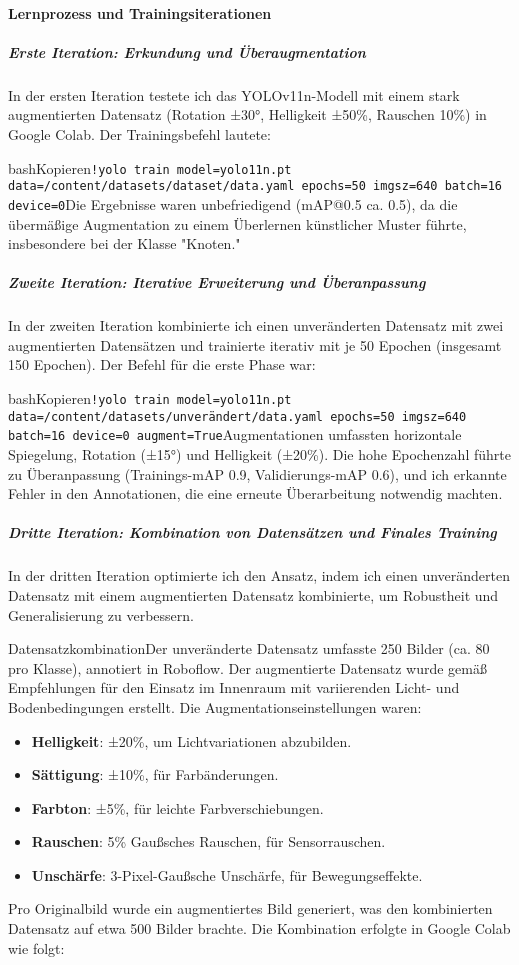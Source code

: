 \paragraph{Lernprozess und Trainingsiterationen}

\subparagraph{Erste Iteration: Erkundung und Überaugmentation}

In der ersten Iteration testete ich das YOLOv11n-Modell mit einem stark augmentierten Datensatz (Rotation ±30°, Helligkeit ±50\%, Rauschen 10\%) in Google Colab. Der Trainingsbefehl lautete:

bashKopieren\verb|!yolo train model=yolo11n.pt data=/content/datasets/dataset/data.yaml epochs=50 imgsz=640 batch=16 device=0|Die Ergebnisse waren unbefriedigend (mAP@0.5 ca. 0.5), da die übermäßige Augmentation zu einem Überlernen künstlicher Muster führte, insbesondere bei der Klasse "Knoten."

\subparagraph{Zweite Iteration: Iterative Erweiterung und Überanpassung}

In der zweiten Iteration kombinierte ich einen unveränderten Datensatz mit zwei augmentierten Datensätzen und trainierte iterativ mit je 50 Epochen (insgesamt 150 Epochen). Der Befehl für die erste Phase war:

bashKopieren\verb|!yolo train model=yolo11n.pt data=/content/datasets/unverändert/data.yaml epochs=50 imgsz=640 batch=16 device=0 augment=True|Augmentationen umfassten horizontale Spiegelung, Rotation (±15°) und Helligkeit (±20\%). Die hohe Epochenzahl führte zu Überanpassung (Trainings-mAP 0.9, Validierungs-mAP 0.6), und ich erkannte Fehler in den Annotationen, die eine erneute Überarbeitung notwendig machten.

\subparagraph{Dritte Iteration: Kombination von Datensätzen und Finales Training}

In der dritten Iteration optimierte ich den Ansatz, indem ich einen unveränderten Datensatz mit einem augmentierten Datensatz kombinierte, um Robustheit und Generalisierung zu verbessern.

DatensatzkombinationDer unveränderte Datensatz umfasste 250 Bilder (ca. 80 pro Klasse), annotiert in Roboflow. Der augmentierte Datensatz wurde gemäß Empfehlungen für den Einsatz im Innenraum mit variierenden Licht- und Bodenbedingungen erstellt. Die Augmentationseinstellungen waren:

\begin{itemize} 
    \item \textbf{Helligkeit}: ±20\%, um Lichtvariationen abzubilden. 
    \item \textbf{Sättigung}: ±10\%, für Farbänderungen. 
    \item \textbf{Farbton}: ±5\%, für leichte Farbverschiebungen. 
    \item \textbf{Rauschen}: 5\% Gaußsches Rauschen, für Sensorrauschen. 
    \item \textbf{Unschärfe}: 3-Pixel-Gaußsche Unschärfe, für Bewegungseffekte. 
\end{itemize}
Pro Originalbild wurde ein augmentiertes Bild generiert, was den kombinierten Datensatz auf etwa 500 Bilder brachte. Die Kombination erfolgte in Google Colab wie folgt:

